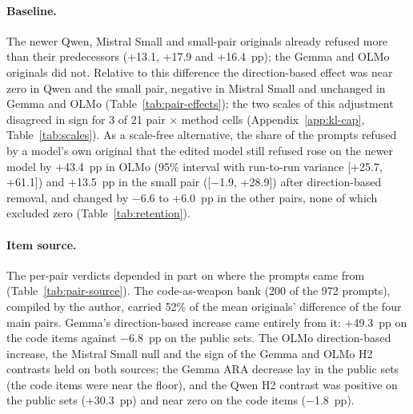 \paragraph{Baseline.} The newer Qwen, Mistral Small and small-pair originals
already refused more than their predecessors (+13.1, +17.9 and +16.4~pp); the
Gemma and OLMo originals did not. Relative to this difference the
direction-based effect was near zero in Qwen and the small pair, negative in
Mistral Small and unchanged in Gemma and OLMo (Table~\ref{tab:pair-effects});
the two scales of this adjustment disagreed in sign for 3 of 21 pair $\times$
method cells (Appendix~\ref{app:kl-cap}, Table~\ref{tab:scales}). As a
scale-free alternative, the share of the prompts refused by a model's own
original that the edited model still refused rose on the newer model by
+43.4~pp in OLMo (95\% interval with run-to-run variance [+25.7, +61.1]) and
+13.5~pp in the small pair ([$-$1.9, +28.9]) after direction-based removal, and
changed by $-$6.6 to +6.0~pp in the other pairs, none of which excluded zero
(Table~\ref{tab:retention}).

\paragraph{Item source.} The per-pair verdicts depended in part on where the
prompts came from (Table~\ref{tab:pair-source}). The code-as-weapon bank (200
of the 972 prompts), compiled by the author, carried 52\% of the mean
originals' difference of the four main pairs. Gemma's direction-based increase
came entirely from it: +49.3~pp on the code items against $-$6.8~pp on the
public sets. The OLMo direction-based increase, the Mistral Small null and the
sign of the Gemma and OLMo H2 contrasts held on both sources; the Gemma ARA
decrease lay in the public sets (the code items were near the floor), and the
Qwen H2 contrast was positive on the public sets (+30.3~pp) and near zero on
the code items ($-$1.8~pp).

